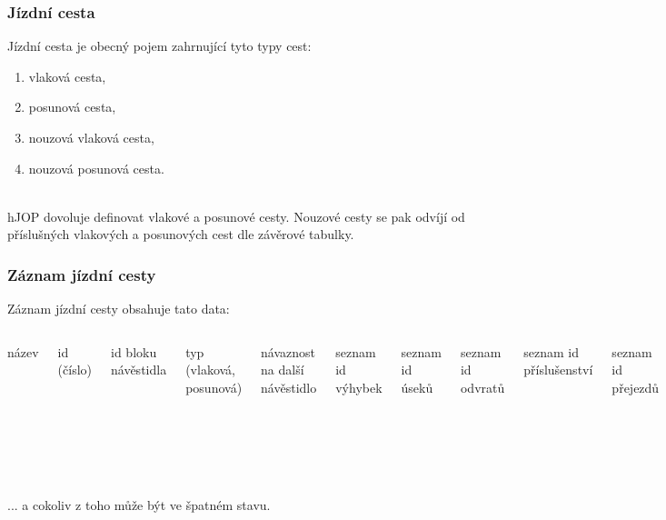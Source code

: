 \documentclass[czech]{beamer}
\begin{document}

\begin{frame}
\frametitle{Jízdní cesta}
Jízdní cesta je obecný pojem zahrnující tyto typy cest:
\begin{enumerate}
\item vlaková cesta,
\item posunová cesta,
\item nouzová vlaková cesta,
\item nouzová posunová cesta.
\end{enumerate}

~\\

hJOP dovoluje definovat vlakové a posunové cesty. Nouzové cesty se pak odvíjí
od příslušných vlakových a posunových cest dle závěrové tabulky.

\end{frame}


\begin{frame}
\frametitle{Záznam jízdní cesty}

Záznam jízdní cesty obsahuje tato data:

\begin{enumerate}
\begin{columns}[c]
\item název
\item id (číslo)
\item id bloku návěstidla
\item typ (vlaková, posunová)
\item návaznost na další návěstidlo
\item seznam id výhybek
\item seznam id úseků
\item seznam id odvratů
\item seznam id příslušenství
\item seznam id přejezdů

\item dodatečné podmínky
	\begin{itemize}
	\item na zámek
	\item (na polohu výhybky)
	\end{itemize}
\item variantní body
\item návaznost na trať
\item rychlost při dalším návěstidle na volno
\item rychlost při dalším návěstidle na stůj
\end{columns}
\end{enumerate}

\pause
... a cokoliv z toho může být ve špatném stavu.

\end{frame}
\end{document}
